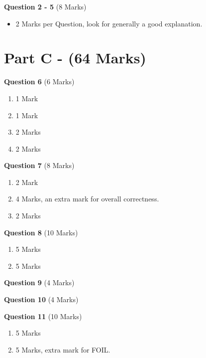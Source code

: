\documentclass[12pt]{article} %
\begin{document}
\textbf{Question 2 - 5} (8 Marks)
\begin{itemize}
  \item 2 Marks per Question, look for generally a good explanation.
\end{itemize}

\section*{Part C - (64 Marks)}
\textbf{Question 6} (6 Marks)
\begin{multicols}{4}
  \begin{enumerate}[label=(\alph*)]
    \item 1 Mark
      \columnbreak
    \item 1 Mark
      \columnbreak
    \item 2 Marks
      \columnbreak
    \item 2 Marks
  \end{enumerate}
\end{multicols}

\textbf{Question 7} (8 Marks)
\begin{multicols}{3}
  \begin{enumerate}[label=(\alph*)]
    \item 2 Mark
      \columnbreak
    \item 4 Marks, an extra mark for overall correctness.
      \columnbreak
    \item 2 Marks
  \end{enumerate}
\end{multicols}

\textbf{Question 8} (10 Marks)
\begin{multicols}{2}
  \begin{enumerate}[label=(\alph*)]
    \item 5 Marks
      \columnbreak
    \item 5 Marks
  \end{enumerate}
\end{multicols}

\textbf{Question 9} (4 Marks)

\textbf{Question 10} (4 Marks)

\textbf{Question 11} (10 Marks)
\begin{multicols}{2}
  \begin{enumerate}[label=(\alph*)]
    \item 5 Marks
      \columnbreak
    \item 5 Marks, extra mark for FOIL.
  \end{enumerate}
\end{multicols}
\end{document}

